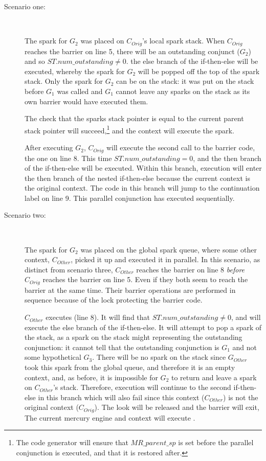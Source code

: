 \begin{description}

    \item[Scenario one:]~

    The spark for $G_2$ was placed on $C_{Orig}$'s local spark stack.
    When $C_{Orig}$ reaches the \joinandcontinue barrier on line 5,
    there will be an outstanding conjunct ($G_2$) and so
    $ST.num\_outstanding \neq 0$.
    the else branch of the if-then-else will be executed,
    whereby the spark for $G_2$ will be popped off the top of the spark
    stack.
    Only the spark for $G_2$ can be on the stack:
    it was put on the stack before $G_1$ was called and $G_1$ cannot
    leave any sparks on the stack as its own \joinandcontinue barrier
    would have executed them.

    The check that the sparks stack pointer is equal to the current
    parent stack pointer will succeed,\footnote{
        The code generator will ensure that $MR\_parent\_sp$ is set
        before the parallel conjunction is executed,
        and that it is restored after.}
    and the context will execute the spark.

    After executing $G_2$,
    $C_{Orig}$ will execute the second call to the barrier code,
    the one on line 8.
    This time $ST.num\_outstanding = 0$,
    and the then branch of the if-then-else will be executed.
    Within this branch,
    execution will enter the then branch of the nested if-then-else
    because
    the current context is the original context.
    The code in this branch will jump to the continuation label on line
    9.
    This parallel conjunction has executed sequentially.

    \item[Scenario two:]~

    The spark for $G_2$ was placed on the global spark queue,
    where some other context, $C_{Other}$, picked it up and executed it
    in parallel.
    In this scenario, as distinct from scenario three,
    $C_{Other}$ reaches the barrier on line 8 \emph{before}
    $C_{Orig}$ reaches the barrier on line 5.
    Even if they both seem to reach the barrier at the same time.
    Their barrier operations are performed in sequence because of the
    lock protecting the barrier code.

    $C_{Other}$ executes \joinandcontinue (line 8).
    It will find that $ST.num\_outstanding \neq 0$,
    and will execute the else branch of the if-then-else.
    It will attempt to pop a spark of the stack,
    as a spark on the stack might representing the outstanding
    conjunction:
    it cannot tell that the outstanding conjunction is $G_1$ and not some
    hypothetical $G_3$.
    There will be no spark on the stack since $G_{Other}$ took this
    spark from the global queue, and therefore it is an empty context,
    and, as before, it is impossible for $G_2$ to return and leave a
    spark on $C_{Other}$'s stack.
    Therefore, execution will continue to the second if-then-else in
    this branch which will also fail since this context ($C_{Other}$)
    is not the original context ($C_{Orig}$).
    The look will be released and the barrier will exit,
    The current mercury engine and context will execute \getglobalwork.


\end{description}
